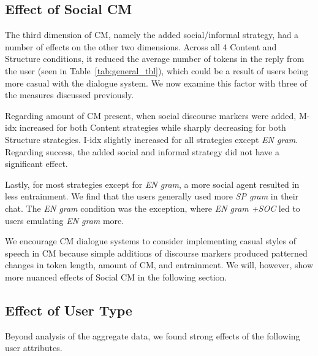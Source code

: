 \documentclass[11pt,a4paper]{article}
\newcommand{\ea}[1]{\textcolor{blue}{\bf\small [#1 --EA]}}
\newcommand{\tref}[1]{Table~\ref{#1}}
\begin{document}

\subsection{Effect of Social CM}
The third dimension of CM, namely the added social/informal strategy, had a number of effects on the other two dimensions.
Across all 4 Content and Structure conditions, it reduced the average number of tokens in the reply from the user (seen in \tref{tab:general_tbl}), which could be a result of users being more casual with the dialogue system.
We now examine this factor with three of the measures discussed previously.

Regarding amount of CM present, when social discourse markers were added, M-idx increased for both Content strategies while sharply decreasing for both Structure strategies.
I-idx slightly increased for all strategies except \textit{EN gram}.
Regarding success, the added social and informal strategy did not have a significant effect.

Lastly, for most strategies except for \textit{EN gram}, a more social agent resulted in less entrainment.
We find that the users generally used more \textit{SP gram} in their chat.
The \textit{EN gram} condition was the exception, where \textit{EN gram +SOC} led to users emulating \textit{EN gram} more.

We encourage CM dialogue systems to consider implementing casual styles of speech in CM because simple additions of discourse markers produced patterned changes in token length, amount of CM, and entrainment.
We will, however, show more nuanced effects of Social CM in the following section.




\subsection{Effect of User Type}

Beyond analysis of the aggregate data, we found strong effects of the following user attributes.
\end{document}
